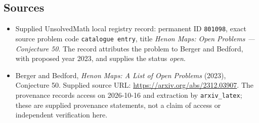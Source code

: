 \documentclass[11pt]{article}
\begin{document}
\subsection{Sources}
\begin{itemize}
\item Supplied UnsolvedMath local registry record: permanent ID \texttt{801098}, exact source problem code \texttt{catalogue entry}, title \emph{Henon Maps: Open Problems --- Conjecture 50}. The record attributes the problem to Berger and Bedford, with proposed year 2023, and supplies the status \emph{open}.
\item Berger and Bedford, \emph{Henon Maps: A List of Open Problems} (2023), Conjecture 50. Supplied source URL: \url{https://arxiv.org/abs/2312.03907}. The provenance records access on 2026-10-16 and extraction by \texttt{arxiv\_latex}; these are supplied provenance statements, not a claim of access or independent verification here.
\end{itemize}
\end{document}
